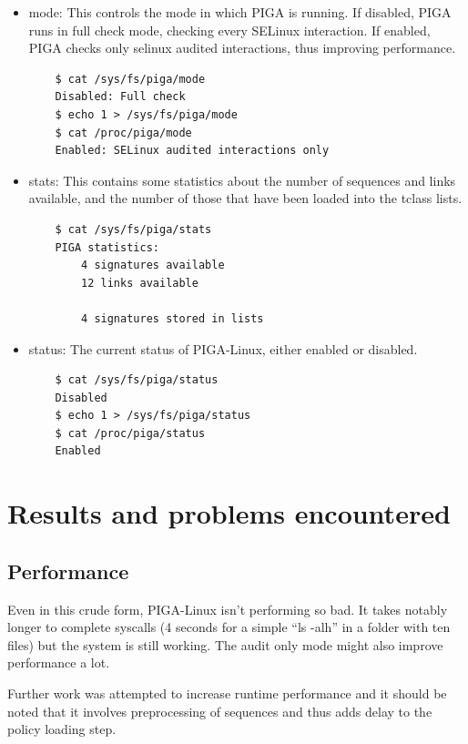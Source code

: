 \documentclass[pdftex,a4paper,titlepage,11pt]{article}
\begin{document}
\begin{itemize}
	\item mode: This controls the mode in which PIGA is running. If disabled,
PIGA runs in full check mode, checking every SELinux interaction. If enabled,
PIGA checks only selinux audited interactions, thus improving performance.
	\begin{lstlisting}
	$ cat /sys/fs/piga/mode
	Disabled: Full check
	$ echo 1 > /sys/fs/piga/mode
	$ cat /proc/piga/mode
	Enabled: SELinux audited interactions only
	\end{lstlisting}
	\item stats: This contains some statistics about the number of sequences and
links available, and the number of those that have been loaded into the tclass
lists.
	\begin{lstlisting}
	$ cat /sys/fs/piga/stats
	PIGA statistics:
		4 signatures available
		12 links available

		4 signatures stored in lists
	\end{lstlisting}
	\item status: The current status of PIGA-Linux, either enabled or disabled.
	\begin{lstlisting}
	$ cat /sys/fs/piga/status
	Disabled
	$ echo 1 > /sys/fs/piga/status
	$ cat /proc/piga/status
	Enabled
	\end{lstlisting}
\end{itemize}

\newpage

\section{Results and problems encountered}

\subsection{Performance}

Even in this crude form, PIGA-Linux isn't performing so bad. It takes notably
longer to complete syscalls (4 seconds for a simple ``ls -alh'' in a folder with
ten files) but the system is still working. The audit only mode might also
improve performance a lot.

\bigskip

Further work was attempted to increase runtime performance and it should be
noted that it involves preprocessing of sequences and thus adds delay to the
policy loading step.

\bigskip
\end{document}
